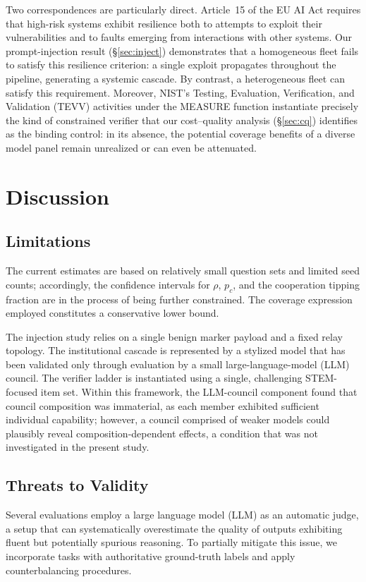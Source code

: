 \documentclass[manuscript,screen,review]{acmart}
\begin{document}
Two correspondences are particularly direct. Article~15 of the EU AI Act requires that high-risk systems exhibit resilience both to attempts to exploit their vulnerabilities and to faults emerging from interactions with other systems. Our prompt-injection result (\S\ref{sec:inject}) demonstrates that a homogeneous fleet fails to satisfy this resilience criterion: a single exploit propagates throughout the pipeline, generating a systemic cascade. By contrast, a heterogeneous fleet can satisfy this requirement. Moreover, NIST’s Testing, Evaluation, Verification, and Validation (TEVV) activities under the MEASURE function instantiate precisely the kind of constrained verifier that our cost–quality analysis (\S\ref{sec:cq}) identifies as the binding control: in its absence, the potential coverage benefits of a diverse model panel remain unrealized or can even be attenuated.

\section{Discussion}
\subsection{Limitations}
The current estimates are based on relatively small question sets and limited seed counts; accordingly, the confidence intervals for $\rho$, $p_c$, and the cooperation tipping fraction are in the process of being further constrained. The coverage expression employed constitutes a conservative lower bound.

The injection study relies on a single benign marker payload and a fixed relay topology. The institutional cascade is represented by a stylized model that has been validated only through evaluation by a small large-language-model (LLM) council. The verifier ladder is instantiated using a single, challenging STEM-focused item set. Within this framework, the LLM-council component found that council composition was immaterial, as each member exhibited sufficient individual capability; however, a council comprised of weaker models could plausibly reveal composition-dependent effects, a condition that was not investigated in the present study.

\subsection{Threats to Validity}
\label{sec:threats}
Several evaluations employ a large language model (LLM) as an automatic judge, a setup that can systematically overestimate the quality of outputs exhibiting fluent but potentially spurious reasoning. To partially mitigate this issue, we incorporate tasks with authoritative ground-truth labels and apply counterbalancing procedures. 
\end{document}
